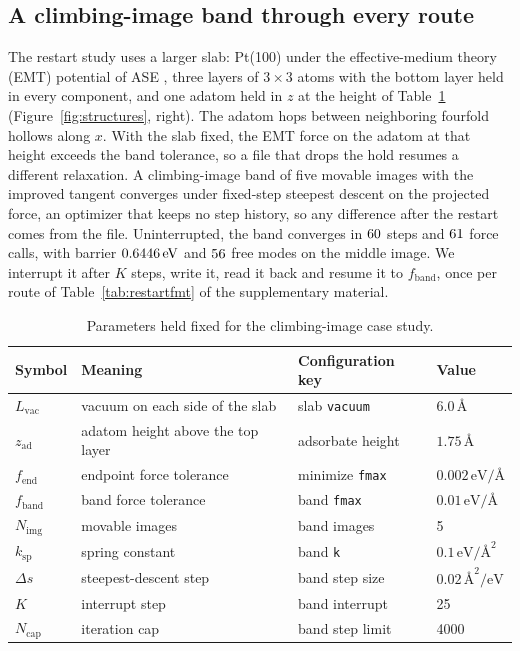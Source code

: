 \documentclass[preprint,12pt]{elsarticle}
\begin{document}
\subsection{A climbing-image band through every route} The restart study uses a larger slab: Pt(100) under the effective-medium theory (EMT) potential of ASE \cite{jacobsenSemiempiricalEffectiveMedium1996}, three layers of \(3\times3\) atoms with the bottom layer held in every component, and one adatom held in \(z\) at the height of Table~\ref{tab:params} (Figure~\ref{fig:structures}, right).
The adatom hops between neighboring fourfold hollows along \(x\).
With the slab fixed, the EMT force on the adatom at that height exceeds the band tolerance, so a file that drops the hold resumes a different relaxation.
A climbing-image band of five movable images with the improved tangent \cite{henkelmanClimbingImageNudged2000,henkelmanImprovedTangentEstimate2000} converges under fixed-step steepest descent on the projected force, an optimizer that keeps no step history, so any difference after the restart comes from the file.
Uninterrupted, the band converges in \(60\) steps and \(61\) force calls, with barrier \(0.6446\,\mathrm{eV}\) and \(56\) free modes on the middle image.
We interrupt it after \(K\) steps, write it, read it back and resume it to \(f_{\mathrm{band}}\), once per route of Table~\ref*{tab:restartfmt} of the supplementary material.

\begin{table}[tbp] \centering \small \caption{Parameters held fixed for the climbing-image case study.}
\label{tab:params}
\begin{tabular}{@{}llll@{}}
\toprule
Symbol & Meaning & Configuration key & Value \\
\midrule
\(L_{\mathrm{vac}}\) & vacuum on each side of the slab & slab \texttt{vacuum} & \(6.0\,\text{\AA}\) \\
\(z_{\mathrm{ad}}\) & adatom height above the top layer & adsorbate height & \(1.75\,\text{\AA}\) \\
\(f_{\mathrm{end}}\) & endpoint force tolerance & minimize \texttt{fmax} & \(0.002\,\mathrm{eV/\text{\AA}}\) \\
\(f_{\mathrm{band}}\) & band force tolerance & band \texttt{fmax} & \(0.01\,\mathrm{eV/\text{\AA}}\) \\
\(N_{\mathrm{img}}\) & movable images & band images & 5 \\
\(k_{\mathrm{sp}}\) & spring constant & band \texttt{k} & \(0.1\,\mathrm{eV/\text{\AA}^2}\) \\
\(\Delta s\) & steepest-descent step & band step size & \(0.02\,\text{\AA}^2/\mathrm{eV}\) \\
\(K\) & interrupt step & band interrupt & 25 \\
\(N_{\mathrm{cap}}\) & iteration cap & band step limit & 4000 \\
\bottomrule
\end{tabular}
\end{table}
\end{document}
